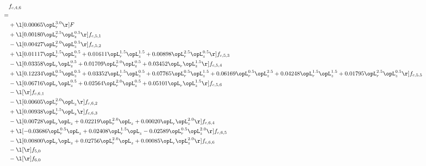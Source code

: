 \begin{alignat}{2} 
\label{eq:f_46_2} 
& f_{c,4,6} \nonumber \\ 
 = \\ 
& + \l[  0.00065 \opL_r^{3.0}  \r] F \nonumber \\ 
& + \l[  0.00180 \opL_r^{2.5} \opL_z^{0.5}  \r] f_{c,5,1} \nonumber \\ 
& - \l[  0.00427 \opL_r^{2.0} \opL_z^{0.5}  \r] f_{c,5,2} \nonumber \\ 
& + \l[  0.01117 \opL_r^{1.5} \opL_z^{0.5} +  0.01611 \opL_r^{1.5} \opL_z^{1.5} +  0.00898 \opL_r^{2.5} \opL_z^{0.5}  \r] f_{c,5,3} \nonumber \\ 
& - \l[  0.03358 \opL_r \opL_z^{0.5} +  0.01709 \opL_r^{2.0} \opL_z^{0.5} +  0.03452 \opL_r \opL_z^{1.5}  \r] f_{c,5,4} \nonumber \\ 
& + \l[  0.12234 \opL_r^{0.5} \opL_z^{0.5} +  0.03352 \opL_r^{1.5} \opL_z^{0.5} +  0.07765 \opL_r^{0.5} \opL_z^{1.5} +  0.06169 \opL_r^{0.5} \opL_z^{2.5} +  0.04248 \opL_r^{1.5} \opL_z^{1.5} +  0.01795 \opL_r^{2.5} \opL_z^{0.5}  \r] f_{c,5,5} \nonumber \\ 
& - \l[  0.06716 \opL_r \opL_z^{0.5} +  0.02564 \opL_r^{2.0} \opL_z^{0.5} +  0.05101 \opL_r \opL_z^{1.5}  \r] f_{c,5,6} \nonumber \\ 
& - \l[  \r] f_{c,6,1} \nonumber \\ 
& - \l[  0.00605 \opL_r^{2.0} \opL_z  \r] f_{c,6,2} \nonumber \\ 
& + \l[  0.00938 \opL_r^{1.5} \opL_z  \r] f_{c,6,3} \nonumber \\ 
& - \l[  0.00728 \opL_r \opL_z +  0.02219 \opL_r^{2.0} \opL_z +  0.00020 \opL_r \opL_z^{2.0}  \r] f_{c,6,4} \nonumber \\ 
& + \l[  -0.03686 \opL_r^{0.5} \opL_z +  0.02408 \opL_r^{1.5} \opL_z   -0.02589 \opL_r^{0.5} \opL_z^{2.0}  \r] f_{c,6,5} \nonumber \\ 
& - \l[  0.00800 \opL_r \opL_z +  0.02756 \opL_r^{2.0} \opL_z +  0.00085 \opL_r \opL_z^{2.0}  \r] f_{c,6,6} \nonumber \\ 
& - \l[  \r] f_{5,0} \nonumber \\ 
& - \l[  \r] f_{6,0} \nonumber \\ 
\end{alignat} 



